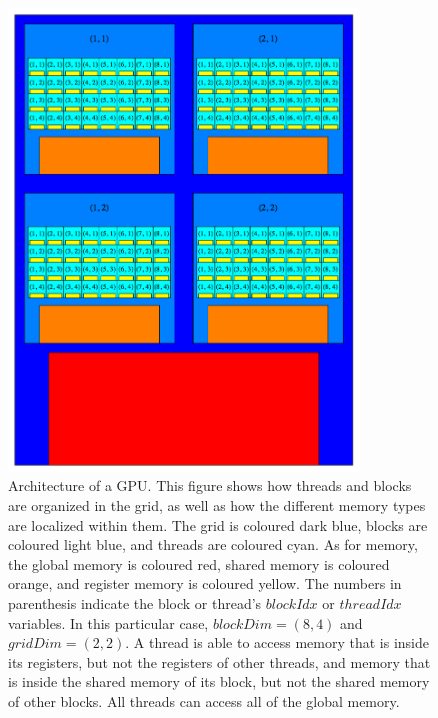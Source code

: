 \documentclass[12pt]{report}
\begin{document}
\begin{figure}
\center
\includegraphics[width=0.83\textwidth]{Figures/gpu_arc.png}
\caption[Architecture of a GPU]
{Architecture of a GPU. This figure shows how threads and blocks are organized in the grid, as well as how the different memory types are localized within them. The grid is coloured dark blue, blocks are coloured light blue, and threads are coloured cyan. As for memory, the global memory is coloured red, shared memory is coloured orange, and register memory is coloured yellow. The numbers in parenthesis indicate the block or thread's $blockIdx$ or $threadIdx$ variables. In this particular case, $blockDim=(8,4)$ and $gridDim=(2,2)$. A thread is able to access memory that is inside its registers, but not the registers of other threads, and memory that is inside the shared memory of its block, but not the shared memory of other blocks. All threads can access all of the global memory.}
\label{fig:gpuarc}
\end{figure}
\end{document}
